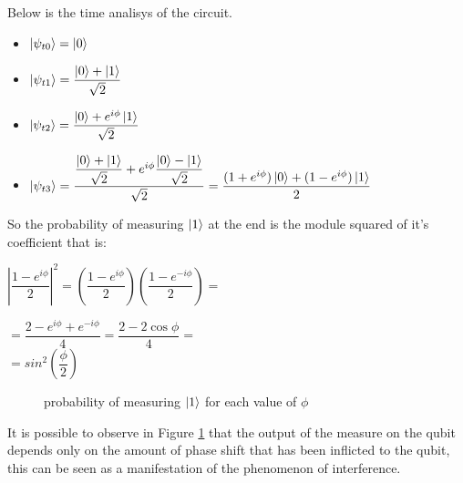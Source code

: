 \documentclass{article}
\begin{document}
\begin{samepage}
	\noindent Below is the time analisys of the circuit.
	\begin{itemize}

		\item $\ket{\psi_{t0}} = \ket{0}$
		\item $\ket{\psi_{t1}} = \dfrac{\ket{0}+\ket{1}}{\sqrt{2}}$
		\item $\ket{\psi_{t2}} = \dfrac{\ket{0}+e^{i\phi}\ket{1}}{\sqrt{2}}$
		\item $\ket{\psi_{t3}} = \dfrac{\dfrac{\ket{0}+\ket{1}}{\sqrt{2}}+e^{i\phi}\dfrac{\ket{0}-\ket{1}}
			      {\sqrt{2}}}{\sqrt{2}}   = \dfrac{(1+e^{i\phi})\ket{0}+(1-e^{i\phi})\ket{1}}{2}$




	\end{itemize}
\end{samepage}
\vspace{20pt}
\noindent So the probability of measuring $\ket{1}$ at the end is the module squared of it's\\
coefficient that is:\\
\vspace{10pt}

$\left|\dfrac{1-e^{i\phi}}{2}\right|^2 = \left(\dfrac{1-e^{i\phi}}{2}\right)\left(\dfrac{1-e^{-i\phi}}{2}\right) =$\\
\vspace{5pt}


$ = \dfrac{2-e^{i\phi}+e^{-i\phi}}{4} = \dfrac{2-2\cos{\phi}}{4} =$\\

\vspace{3pt}
$ = sin^2{\left(\dfrac{\phi}{2}\right)}$

\vspace{10pt}



\begin{figure}[H]
	\centering
	\caption{probability of measuring $\ket{1}$ for each value of $\phi$}
	\label{interferencegraph}
\end{figure}
\noindent It is possible to observe in Figure \ref{interferencegraph}
that the output of the measure on the qubit depends only on the
amount of phase shift that has been inflicted
to the qubit, this can be seen as a manifestation of the phenomenon
of interference.
\end{document}
